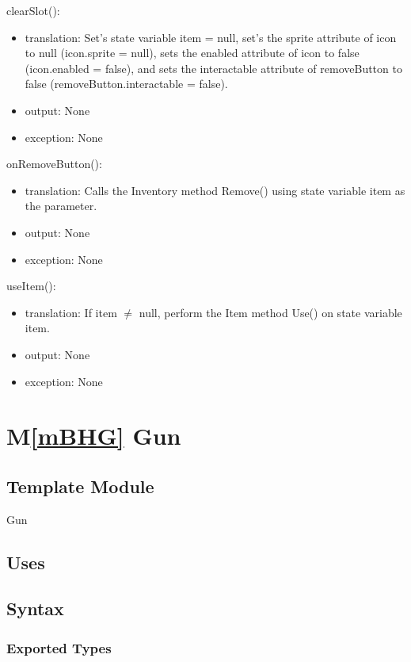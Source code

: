 \documentclass[12pt]{article}
\newcommand{\mref}[1]{M\ref{#1}}
\begin{document}
\noindent clearSlot():
\begin{itemize}
\item translation: Set's state variable item = null, set's the sprite attribute of icon to null (icon.sprite = null), sets the enabled attribute of icon to false (icon.enabled = false), and sets the interactable attribute of removeButton to false (removeButton.interactable = false).
\item output: None
\item exception: None
\end{itemize}

\noindent onRemoveButton():
\begin{itemize}
\item translation: Calls the Inventory method Remove() using state variable item as the parameter.
\item output: None
\item exception: None
\end{itemize}

\noindent useItem():
\begin{itemize}
\item translation: If item $\neq$ null, perform the Item method Use() on state variable item.
\item output: None
\item exception: None
\end{itemize}

\newpage
\section*{\mref{mBHG} Gun}

\subsection*{Template Module}

Gun

\subsection* {Uses}


\subsection* {Syntax}

\subsubsection* {Exported Types}
\end{document}
